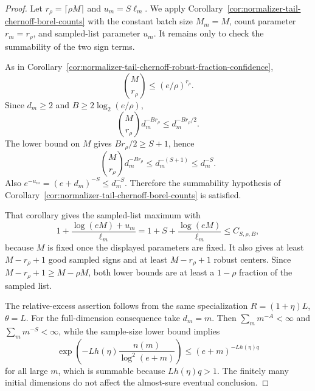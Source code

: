 \documentclass[11pt]{amsart}
\numberwithin{equation}{section}
\theoremstyle{definition}
\theoremstyle{remark}
\begin{document}
\begin{proof}
Let \(r_\rho=\lceil\rho M\rceil\) and \(u_m=S\ell_m\).  We apply
Corollary~\ref{cor:normalizer-tail-chernoff-borel-counts} with the constant
batch size \(M_m=M\), count parameter \(r_m=r_\rho\), and sampled-list parameter
\(u_m\).  It remains only to check the summability of the two sign terms.

As in Corollary~\ref{cor:normalizer-tail-chernoff-robust-fraction-confidence},
\[
  \binom{M}{r_\rho}\le (e/\rho)^{r_\rho}.
\]
Since \(d_m\ge2\) and \(B\ge2\log_2(e/\rho)\),
\[
  \binom{M}{r_\rho}d_m^{-B r_\rho}
  \le d_m^{-B r_\rho/2}.
\]
The lower bound on \(M\) gives \(B r_\rho/2\ge S+1\), hence
\[
  \binom{M}{r_\rho}d_m^{-B r_\rho}\le d_m^{-(S+1)}\le d_m^{-S}.
\]
Also \(e^{-u_m}=(e+d_m)^{-S}\le d_m^{-S}\).  Therefore the summability
hypothesis of Corollary~\ref{cor:normalizer-tail-chernoff-borel-counts} is
satisfied.

That corollary gives the sampled-list maximum with
\[
  1+\frac{\log(eM)+u_m}{\ell_m}
  =1+S+\frac{\log(eM)}{\ell_m}
  \le C_{S,\rho,B},
\]
because \(M\) is fixed once the displayed parameters are fixed.  It also gives
at least \(M-r_\rho+1\) good sampled signs and at least \(M-r_\rho+1\) robust
centers.  Since \(M-r_\rho+1\ge M-\rho M\), both lower bounds are at least a
\(1-\rho\) fraction of the sampled list.

The relative-excess assertion follows from the same specialization
\(R=(1+\eta)L\), \(\theta=L\).  For the full-dimension consequence take
\(d_m=m\).  Then \(\sum_m m^{-A}<\infty\) and \(\sum_m m^{-S}<\infty\), while
the sample-size lower bound implies
\[
  \exp\left(-Lh(\eta)\frac{n(m)}{\log^2(e+m)}\right)
  \le (e+m)^{-Lh(\eta)q}
\]
for all large \(m\), which is summable because \(Lh(\eta)q>1\).  The finitely
many initial dimensions do not affect the almost-sure eventual conclusion.
\end{proof}
\end{document}
